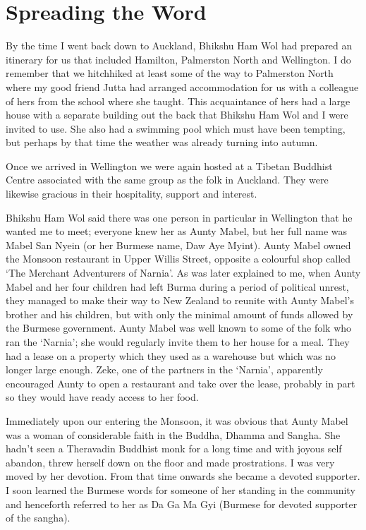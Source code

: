 \chapter{Spreading the Word}

By the time I went back down to Auckland, Bhikshu Ham Wol had prepared
an itinerary for us that included Hamilton, Palmerston North and
Wellington. I do remember that we hitchhiked at least some of the way to
Palmerston North where my good friend Jutta had arranged accommodation
for us with a colleague of hers from the school where she taught. This
acquaintance of hers had a large house with a separate building out the
back that Bhikshu Ham Wol and I were invited to use. She also had a
swimming pool which must have been tempting, but perhaps by that time
the weather was already turning into autumn.

Once we arrived in Wellington we were again hosted at a Tibetan Buddhist
Centre associated with the same group as the folk in Auckland. They were
likewise gracious in their hospitality, support and interest.

Bhikshu Ham Wol said there was one person in particular in Wellington
that he wanted me to meet; everyone knew her as Aunty Mabel, but her
full name was Mabel San Nyein (or her Burmese name, Daw Aye Myint).
Aunty Mabel owned the Monsoon restaurant in Upper Willis Street,
opposite a colourful shop called `The Merchant Adventurers of Narnia'.
As was later explained to me, when Aunty Mabel and her four children had
left Burma during a period of political unrest, they managed to make
their way to New Zealand to reunite with Aunty Mabel's brother and his
children, but with only the minimal amount of funds allowed by the
Burmese government. Aunty Mabel was well known to some of the folk who
ran the `Narnia'; she would regularly invite them to her house for a
meal. They had a lease on a property which they used as a warehouse but
which was no longer large enough. Zeke, one of the partners in the
`Narnia', apparently encouraged Aunty to open a restaurant and take over
the lease, probably in part so they would have ready access to her food.

Immediately upon our entering the Monsoon, it was obvious that Aunty
Mabel was a woman of considerable faith in the Buddha, Dhamma and
Sangha. She hadn't seen a Theravadin Buddhist monk for a long time and
with joyous self abandon, threw herself down on the floor and made
prostrations. I was very moved by her devotion. From that time onwards
she became a devoted supporter. I soon learned the Burmese words for
someone of her standing in the community and henceforth referred to her
as Da Ga Ma Gyi (Burmese for devoted supporter of the sangha).

